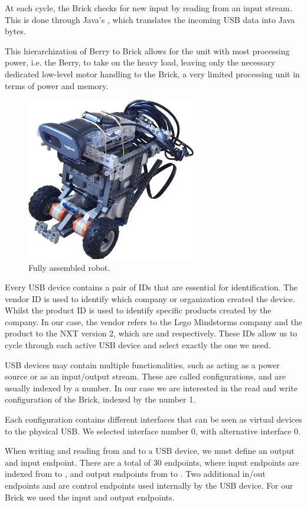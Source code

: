 At each cycle, the Brick checks for new input by reading from an input stream. This is done through
Java's , which translates the incoming USB data into Java bytes.

This hierarchization of Berry to Brick allows for the unit with most processing power, i.e.  the
Berry, to take on the heavy load, leaving only the necessary dedicated low-level motor handling to
the Brick, a very limited processing unit in terms of power and memory.

\begin{figure}[h]
  \centering\includegraphics[width=0.66\textwidth]{imgs/robot.png}
  \caption{Fully assembled robot.}
\end{figure}

Every USB device contains a pair of IDs that are essential for identification. The vendor ID is
used to identify which company or organization created the device. Whilst the product ID is used to
identify specific products created by the company. In our case, the vendor refers to the Lego
Mindstorms company and the product to the NXT version 2, which are  and 
respectively.  These IDs allow us to cycle through each active USB device and select exactly the
one we need.

USB devices may contain multiple functionalities, such as acting as a power source or as an
input/output stream. These are called configurations, and are usually indexed by a number. In our
case we are interested in the read and write configuration of the Brick, indexed by the number 1.

Each configuration contains different interfaces that can be seen as virtual devices to the
physical USB. We selected interface number 0, with alternative interface 0.

When writing and reading from and to a USB device, we must define an output and input endpoint.
There are a total of 30 endpoints, where input endpoints are indexed from  to
, and output endpoints from  to . Two additional in/out endpoints
 and  are control endpoints used internally by the USB device. For our Brick
we used the input  and output  endpoints.
